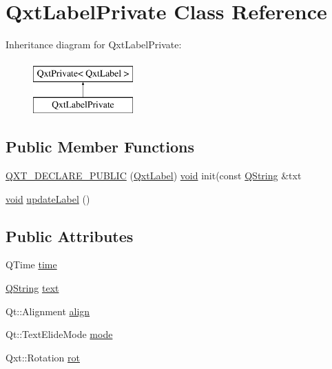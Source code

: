 \hypertarget{class_qxt_label_private}{\section{Qxt\-Label\-Private Class Reference}
\label{class_qxt_label_private}
}
Inheritance diagram for Qxt\-Label\-Private\-:\begin{figure}[H]
\begin{center}
\leavevmode
\includegraphics[height=2.000000cm]{class_qxt_label_private}
\end{center}
\end{figure}
\subsection*{Public Member Functions}
\begin{DoxyCompactItemize}
\item 
\hyperlink{class_qxt_label_private_aa74bc3e26b661fa5f649b40bd045afac}{Q\-X\-T\-\_\-\-D\-E\-C\-L\-A\-R\-E\-\_\-\-P\-U\-B\-L\-I\-C} (\hyperlink{class_qxt_label}{Qxt\-Label}) \hyperlink{group___u_a_v_objects_plugin_ga444cf2ff3f0ecbe028adce838d373f5c}{void} init(const \hyperlink{group___u_a_v_objects_plugin_gab9d252f49c333c94a72f97ce3105a32d}{Q\-String} \&txt
\item 
\hyperlink{group___u_a_v_objects_plugin_ga444cf2ff3f0ecbe028adce838d373f5c}{void} \hyperlink{class_qxt_label_private_a922552f72ace608ac556525d668c0b1f}{update\-Label} ()
\end{DoxyCompactItemize}
\subsection*{Public Attributes}
\begin{DoxyCompactItemize}
\item 
Q\-Time \hyperlink{class_qxt_label_private_ad849e9287e86c639603dc2b90118a1d4}{time}
\item 
\hyperlink{group___u_a_v_objects_plugin_gab9d252f49c333c94a72f97ce3105a32d}{Q\-String} \hyperlink{class_qxt_label_private_a570ce02e6d9c6514366c6cb2651168c6}{text}
\item 
Qt\-::\-Alignment \hyperlink{class_qxt_label_private_af8c3df522f1c449c56c268c7b3ab3bb7}{align}
\item 
Qt\-::\-Text\-Elide\-Mode \hyperlink{class_qxt_label_private_ada43d1aa852ad9fef6b605b85d3653f1}{mode}
\item 
Qxt\-::\-Rotation \hyperlink{class_qxt_label_private_a6e7a26bf3283fc44660c2b8fd35e866b}{rot}
\end{DoxyCompactItemize}
